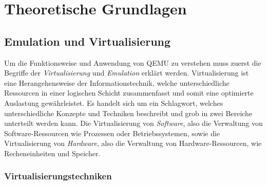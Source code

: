 

\clearpage

\chapter{Theoretische Grundlagen}

\section{Emulation und Virtualisierung}

Um die Funktionsweise und Anwendung von QEMU zu verstehen muss zuerst die
Begriffe der \textit{Virtualisierung} und \textit{Emulation} erklärt werden.
\newline
Virtualisierung ist eine Herangehensweise der Informationstechnik, welche
unterschiedliche Ressourcen in einer logischen Schicht zusammenfasst und somit
eine optimierte Auslastung
gewährleistet\cite{BSKompakt_Virt}.
Es handelt sich um ein Schlagwort, welches unterschiedliche Konzepte und
Techniken beschreibt und grob in zwei Bereiche unterteilt werden kann.
Die Virtualisierung von \textit{Software}, also die Verwaltung von
Software-Ressourcen wie Prozessen oder Betriebssystemen, sowie die
Virtualisierung von \textit{Hardware}, also die Verwaltung von
Hardware-Ressourcen, wie Recheneinheiten und
Speicher\cite{MasterkursVirtParaSys_Virt}.

\subsection{Virtualisierungstechniken}

